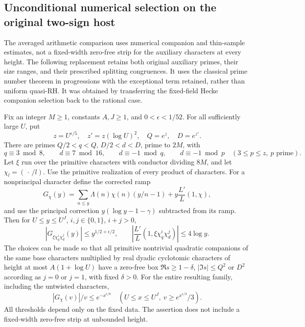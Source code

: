 \subsection{Unconditional numerical selection on the original two-sign host}
\label{sec:unconditional-qs}

The averaged arithmetic comparison uses numerical companion and thin-sample
estimates, not a fixed-width zero-free strip for the auxiliary characters
at every height.  The following replacement retains both original
auxiliary primes, their size ranges, and their prescribed splitting
congruences.  It uses the classical prime number theorem in progressions
with the exceptional term retained, rather than uniform quasi-RH.
It was obtained by transferring the fixed-field Hecke companion
selection back to the rational case.

\begin{theorem}\label{thm:unconditional-qs}
Fix an integer \(M\ge1\), constants \(A,J\ge1\), and
\(0<\epsilon<1/52\).  For all sufficiently large \(U\), put
\[
 z=U^{\epsilon/5},\quad z'=z(\log U)^2,\quad Q=e^z,\quad D=e^{z'}.
\]
There are primes \(Q/2<q<Q\), \(D/2<d<D\), prime to \(2M\),
with
\[
 q\equiv3\bmod8,\qquad d\equiv7\bmod16,\qquad
 d\equiv-1\bmod q,\qquad d\equiv-1\bmod p
       \quad(3\le p\le z,\ p\text{ prime}).
\]
Let \(\xi\) run over the primitive characters with conductor dividing
\(8M\), and let \(\chi_l=(\,\cdot\,/l)\).
Use the primitive realization of every product of characters. For a
nonprincipal character define the corrected ramp
\[
 G_\chi(y)=\sum_{n\le y}\Lambda(n)\chi(n)(y/n-1)
                  +y\frac{L'}{L}(1,\chi),
\]
and use the principal correction \(y(\log y-1-\gamma)\) subtracted
from its ramp.  Then for \(U\le y\le U^J\), \(i,j\in\{0,1\}\),
\(i+j>0\),
\begin{equation}\label{eq:unconditional-companion}
 |G_{\xi\chi_q^i\chi_d^j}(y)|\le y^{1/2+\epsilon/2},\qquad
 \left|\frac{L'}{L}(1,\xi\chi_q^i\chi_d^j)\right|\le4\log y .
\end{equation}
The choices can be made so that all primitive nontrivial quadratic
companions of the same base characters multiplied by real dyadic
cyclotomic characters of height at most \(A(1+\log U)\) have a
zero-free box \(\Re s\ge1-\delta\), \(|\Im s|\le Q^2\) or \(D^2\)
according as \(j=0\) or \(j=1\), with fixed \(\delta>0\).
For the entire resulting family, including the untwisted characters,
\begin{equation}\label{eq:unconditional-thin}
 |G_\chi(v)|/v\le e^{-x^{\epsilon/8}}
 \quad (U\le x\le U^J,\ v\ge e^{x^{\epsilon/3}}/3).
\end{equation}
All thresholds depend only on the fixed data.  The assertion does
not include a fixed-width zero-free strip at unbounded height.
\end{theorem}

